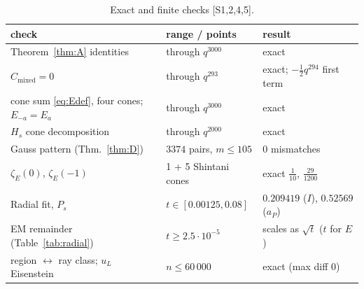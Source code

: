\documentclass[11pt]{article}
\theoremstyle{definition}
\theoremstyle{plain}
\newcommand{\Cmixed}{C_{\mathrm{mixed}}}
\newcommand{\src}[1]{\textup{[S#1]}}
\begin{document}
\begin{table}[ht]\centering\small
\begin{tabular}{p{6.2cm}p{4.2cm}p{4.2cm}}\toprule
check & range / points & result\\\midrule
Theorem~\ref{thm:A} identities & through $q^{3000}$ & exact\\
$\Cmixed=0$ & through $q^{293}$ & exact; $-\tfrac12q^{294}$ first term\\
cone sum \eqref{eq:Edef}, four cones; $E_{-a}=E_a$ & through $q^{3000}$ & exact\\
$H_s$ cone decomposition & through $q^{2000}$ & exact\\
Gauss pattern (Thm.~\ref{thm:D}) & $3374$ pairs, $m\le105$ & 0 mismatches\\
$\zeta_E(0)$, $\zeta_E(-1)$ & 1 + 5 Shintani cones & exact $\tfrac1{10}$, $\tfrac{29}{1200}$\\
Radial fit, $P_s$ & $t\in[0.00125,0.08]$ & $0.209419$ ($I$), $0.52569$ ($a_P$)\\
EM remainder (Table~\ref{tab:radial}) & $t\ge2.5\cdot10^{-5}$ & scales as $\sqrt t$ ($t$ for $E$)\\
region $\leftrightarrow$ ray class; $u_L$ Eisenstein & $n\le60\,000$ & exact (max diff $0$)\\
\bottomrule
\end{tabular}
\caption{Exact and finite checks \src{1,2,4,5}.}
\end{table}
\end{document}
